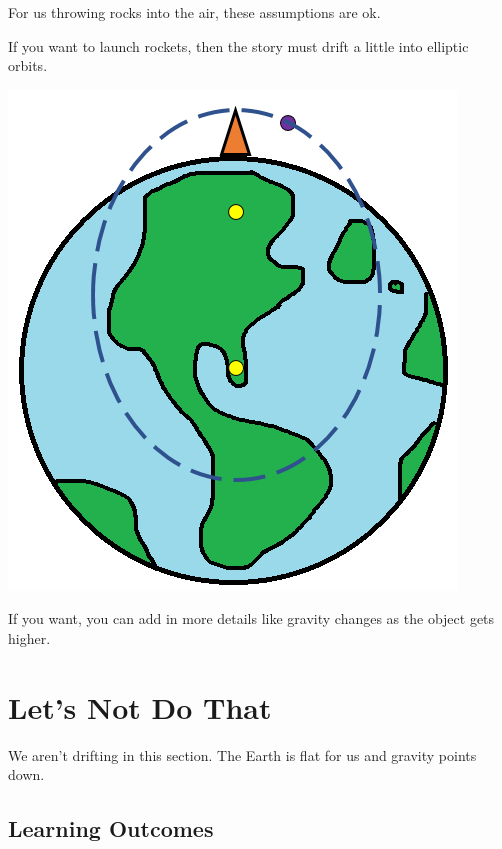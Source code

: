 \documentclass{ximera}
\begin{document}
For us throwing rocks into the air, these assumptions are ok.

If you want to launch rockets, then the story must drift a little into elliptic orbits.  




\begin{center}
\includegraphics{Earth-Gravity.png}
\end{center}


If you want, you can add in more details like gravity changes as the object gets higher.






\section{Let's Not Do That}


We aren't drifting in this section.  The Earth is flat for us and gravity points down.















\subsection{Learning Outcomes}
\end{document}
